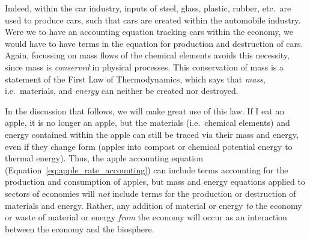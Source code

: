 
Indeed, within the car industry, inputs of steel, glass, plastic, rubber, etc.\ are used
to produce cars, such that cars are created within the automobile industry. Were we to
have an accounting equation tracking cars within the economy, we would have to 
have terms in the equation for production and destruction of cars. Again, focussing on
mass flows of the chemical elements avoids this necessity, since mass is \emph{conserved} in
physical processes. This conservation of mass is a statement of the 
First Law of Thermodynamics, 
which says that \emph{mass}, i.e.\ materials, and \emph{energy}
can neither be created nor destroyed. 


In the discussion that follows, we will make great use 
of this law.
If I eat an apple, it is no longer an apple, 
but the materials (i.e.\ chemical elements) and energy contained
within the apple can still be traced via their mass and energy,
even if they change form (apples into compost or 
chemical potential energy to thermal energy).
Thus, the apple accounting equation
(Equation~\ref{eq:apple_rate_accounting}) can include
terms accounting for the production and consumption of apples, 
but mass and energy equations applied to 
sectors of economies will \emph{not} include terms for the 
production or destruction of materials and energy. 
Rather, any addition of material or energy \emph{to} the economy
or waste of material or energy \emph{from} the economy
will occur as an interaction between the economy and the biosphere.





